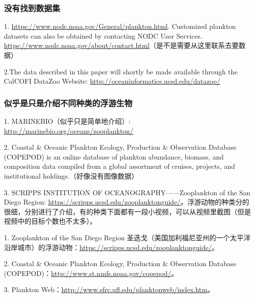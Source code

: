 \subsubsection{没有找到数据集}
1. \url{https://www.nodc.noaa.gov/General/plankton.html}. Customized plankton datasets can also be obtained by contacting NODC User Services. \url{https://www.nodc.noaa.gov/about/contact.html}（是不是需要从这里联系去要数据）

2.The data described in this paper will shortly be made available through the CalCOFI DataZoo Website: \url{http://oceaninformatics.ucsd.edu/datazoo/}


\subsubsection{似乎是只是介绍不同种类的浮游生物}
1. MARINEBIO（似乎只是简单地介绍）: \url{http://marinebio.org/oceans/zooplankton/}

2. Coastal \& Oceanic Plankton Ecology, Production \& Observation Database (COPEPOD) is an online database of plankton abundance, biomass, and composition data compiled from a global assortment of cruises, projects, and institutional holdings.（好像没有图像数据）

3. SCRIPPS INSTITUTION OF OCEANOGRAPHY——Zooplankton of the San Diego Region: \url{https://scripps.ucsd.edu/zooplanktonguide/}。浮游动物的种类分的很细，分别进行了介绍，有的种类下面都有一段小视频，可以从视频里截图（但是视频中的目标个数也不太多）。

{\color{red}1. Zooplankton of the San Diego Region 圣迭戈（美国加利福尼亚州的一个太平洋沿岸城市）的浮游动物：\url{https://scripps.ucsd.edu/zooplanktonguide/}。

2. Coastal \& Oceanic Plankton Ecology, Production \& Observation Database (COPEPOD)：\url{http://www.st.nmfs.noaa.gov/copepod/}。

3. Plankton Web：\url{http://www.sfrc.ufl.edu/planktonweb/index.htm}。
}



















